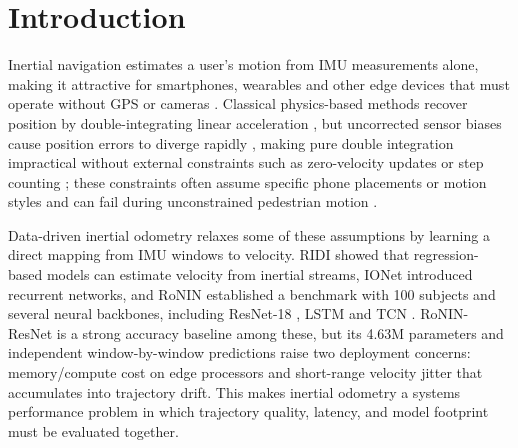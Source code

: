 \documentclass[10pt,conference,letterpaper]{IEEEtran}
\begin{document}
\section{Introduction}

Inertial navigation estimates a user's motion from IMU measurements
alone, making it attractive for smartphones, wearables and other edge
devices that must operate without GPS or cameras \cite{ronin2019}.
Classical physics-based methods recover position by double-integrating
linear acceleration \cite{woodman2007,titterton2004}, but uncorrected
sensor biases cause position errors to diverge rapidly
\cite{woodman2007}, making pure double integration impractical without
external constraints such as zero-velocity updates \cite{foxlin2005}
or step counting \cite{jimenez2009}; these constraints often assume
specific phone placements or motion styles and can fail during
unconstrained pedestrian motion \cite{ridi2018}.

Data-driven inertial odometry relaxes some of these assumptions by
learning a direct mapping from IMU windows to velocity. RIDI
\cite{ridi2018} showed that regression-based models can estimate
velocity from inertial streams, IONet \cite{ionet2018} introduced
recurrent networks, and RoNIN \cite{ronin2019} established a benchmark
with 100 subjects and several neural backbones, including ResNet-18
\cite{resnet2016}, LSTM \cite{lstm1997} and TCN \cite{tcn2018}.
RoNIN-ResNet is a strong accuracy baseline among these, but its 4.63M
parameters and independent window-by-window predictions raise two
deployment concerns: memory/compute cost on edge processors and
short-range velocity jitter that accumulates into trajectory drift.
This makes inertial odometry a systems performance problem in which
trajectory quality, latency, and model footprint must be evaluated
together.
\end{document}
